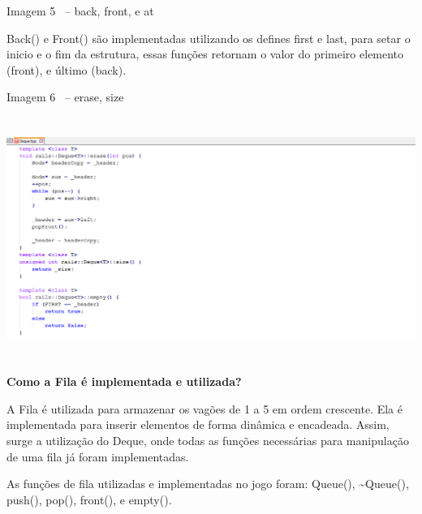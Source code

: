 \documentclass[a4paper]{article}
\begin{document}
{\centering\color{black}
Imagem 5 \ – back, front, e at
\par}


\bigskip

{\color{black}
\textcolor[rgb]{0.13333334,0.13333334,0.13333334}{Back() e Front() são
implementadas utilizando os defines first e last, para setar o inicio e
o fim da estrutura, essas funções retornam o valor do primeiro elemento
(front), e último (back).}}


\bigskip

{\centering\color{black}
Imagem 6 \ – erase, size
\par}

\begin{center}
\includegraphics[width=6.2709in,height=3.111in]{Tra1n-img/Tra1n-img7.png}
\end{center}

\bigskip


\bigskip

{\color{black}
\textbf{\textcolor[rgb]{0.13333334,0.13333334,0.13333334}{Como a Fila é
implementada e utilizada?}}}


\bigskip

{\color{black}
\textcolor[rgb]{0.13333334,0.13333334,0.13333334}{A Fila é utilizada
para armazenar os vagões de 1 a 5 em ordem crescente. Ela é
implementada para inserir elementos de forma dinâmica e encadeada.
Assim, surge a utilização do Deque, onde todas as funções necessárias
para manipulação de uma fila já foram
implementadas.}\textcolor[rgb]{0.13333334,0.13333334,0.13333334}{ \ }}

{\color{black}
\textcolor[rgb]{0.13333334,0.13333334,0.13333334}{As funções de fila
utilizadas e implementadas no jogo foram: Queue(), \~{}Queue(), push(),
pop(), front(), e empty().}}
\end{document}
